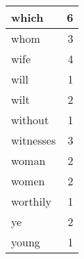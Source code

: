 \begin{center}
\begin{longtable}{l|r}
which & 6 \\ \hline
whom & 3 \\ \hline
wife & 4 \\ \hline
will & 1 \\ \hline
wilt & 2 \\ \hline
without & 1 \\ \hline
witnesses & 3 \\ \hline
woman & 2 \\ \hline
women & 2 \\ \hline
worthily & 1 \\ \hline
ye & 2 \\ \hline
young & 1 \\ \hline
\end{longtable}
\end{center}



\normalsize



